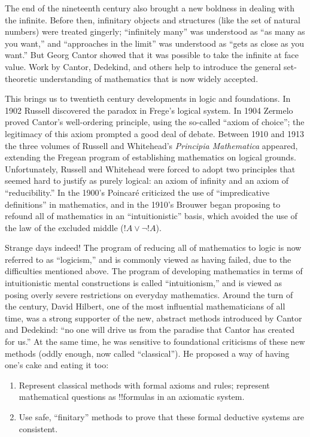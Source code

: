 \documentclass[../../../include/open-logic-section]{subfiles}
\begin{document}
The end of the nineteenth century also brought a new boldness in dealing
with the infinite. Before then, infinitary objects and structures
(like the set of natural numbers) were treated gingerly; ``infinitely
many'' was understood as ``as many as you want,'' and ``approaches in
the limit'' was understood as ``gets as close as you want.'' But Georg
Cantor showed that it was possible to take the infinite at face
value. Work by Cantor, Dedekind, and others help to introduce the
general set-theoretic understanding of mathematics that is now widely accepted.

This brings us to twentieth century developments in logic and foundations.
In 1902 Russell discovered the paradox in Frege's logical system. In
1904 Zermelo proved Cantor's well-ordering principle, using the
so-called ``axiom of choice''; the legitimacy of this axiom prompted a
good deal of debate. Between 1910 and 1913 the three volumes of
Russell and Whitehead's \emph{Principia Mathematica} appeared,
extending the Fregean program of establishing mathematics on logical
grounds. Unfortunately, Russell and Whitehead were forced to adopt two
principles that seemed hard to justify as purely logical: an axiom of
infinity and an axiom of ``reducibility.'' In the 1900's Poincar\'e
criticized the use of ``impredicative definitions'' in mathematics,
and in the 1910's Brouwer began proposing to refound all of
mathematics in an ``intuitionistic'' basis, which avoided the use of
the law of the excluded middle ($!A \lor \lnot !A$).

Strange days indeed!{} The program of reducing all of mathematics to
logic is now referred to as ``logicism,'' and is commonly viewed as
having failed, due to the difficulties mentioned above. The program of
developing mathematics in terms of intuitionistic mental constructions
is called ``intuitionism,'' and is viewed as posing overly severe
restrictions on everyday mathematics. Around the turn of the century,
David Hilbert, one of the most influential mathematicians of all time,
was a strong supporter of the new, abstract methods introduced by
Cantor and Dedekind: ``no one will drive us from the paradise that
Cantor has created for us.'' At the same time, he was sensitive to
foundational criticisms of these new methods (oddly enough, now called
``classical''). He proposed a way of having one's cake and eating it
too:
\begin{enumerate}
\item Represent classical methods with formal axioms and rules;
  represent mathematical questions as !!{formula}s in an axiomatic
  system.
\item Use safe, ``finitary'' methods to prove that these formal
  deductive systems are consistent.
\end{enumerate}
\end{document}
